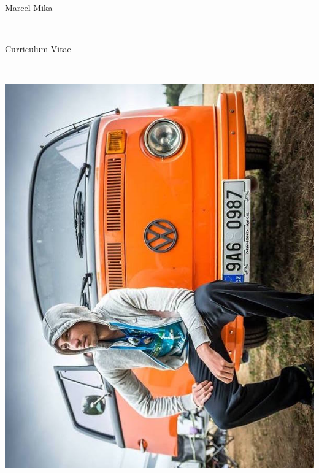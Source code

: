 \documentclass[10pt]{article} %
\begin{document}
\color{text1} %


\par\parindent 95pt {\Huge Marcel Mika }
{  \\[-7pt]\par}
\par\parindent 95pt {\large Curriculum Vitae}
{  \\[-58pt]\par}
\noindent	
\begin{minipage}[t]{0.5\textwidth}%
\vspace{0pt}%
\begin{minipage}[b]{0.30\textwidth} %
\includegraphics[width=\textwidth]{figures/profile.jpg}
\end{minipage}

\end{minipage}
\end{document}
